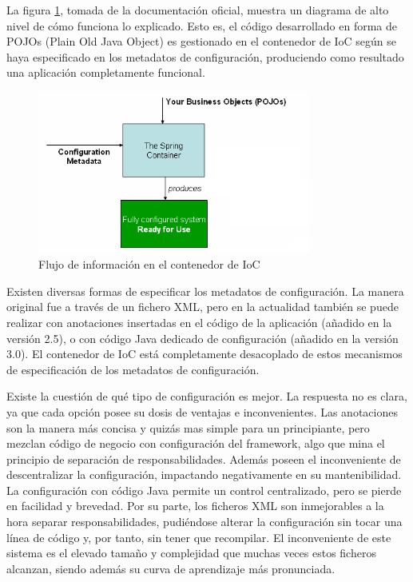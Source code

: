 \documentclass[a4paper]{article}
\begin{document}
    La figura \ref{fig:container_magic}, tomada de la documentación oficial, muestra un diagrama de alto nivel de cómo funciona lo explicado. Esto es, el código desarrollado en forma de POJOs (Plain Old Java Object) es gestionado en el contenedor de IoC según se haya especificado en los metadatos de configuración, produciendo como resultado una aplicación completamente funcional.
    
    \begin{figure}[hbt!]
    	\centering
    	\includegraphics[width=0.8\textwidth,keepaspectratio]{container_magic}
    	\caption{Flujo de información en el contenedor de IoC}
    	\label{fig:container_magic}
    \end{figure}
    
    Existen diversas formas de especificar los metadatos de configuración. La manera original fue a través de un fichero XML, pero en la actualidad también se puede realizar con anotaciones insertadas en el código de la aplicación (añadido en la versión 2.5), o con código Java dedicado de configuración (añadido en la versión 3.0). El contenedor de IoC está completamente desacoplado de estos mecanismos de especificación de los metadatos de configuración.
    
    Existe la cuestión de qué tipo de configuración es mejor. La respuesta no es clara, ya que cada opción posee su dosis de ventajas e inconvenientes. Las anotaciones son la manera más concisa y quizás mas simple para un principiante, pero mezclan código de negocio con configuración del framework, algo que mina el principio de separación de responsabilidades. Además poseen el inconveniente de descentralizar la configuración, impactando negativamente en su mantenibilidad. La configuración con código Java permite un control centralizado, pero se pierde en facilidad y brevedad. Por su parte, los ficheros XML son inmejorables a la hora separar responsabilidades, pudiéndose alterar la configuración sin tocar una línea de código y, por tanto, sin tener que recompilar. El inconveniente de este sistema es el elevado tamaño y complejidad que muchas veces estos ficheros alcanzan, siendo además su curva de aprendizaje más pronunciada.
    
\end{document}
